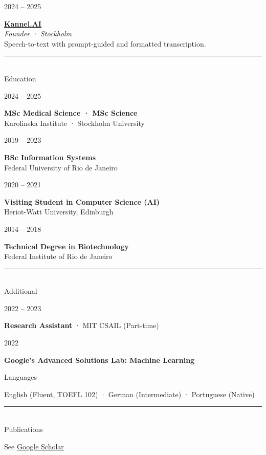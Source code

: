\documentclass[11pt,a4paper]{article}
\newcommand{\cvsection}[1]{%
    \vspace{0.5em}
    \noindent
    \begin{minipage}[t]{2.5cm}
        \rule{2cm}{0.4pt}\\[0.1em]
        {\large #1}
    \end{minipage}%
    \hfill
    \begin{minipage}[t]{14cm}
        \vspace{1.1em}
    \end{minipage}
    \vspace{0em}
}
\newcommand{\cventry}[4]{%
    \noindent
    \begin{minipage}[t]{2.5cm}
        \raggedleft
        \small #1
    \end{minipage}%
    \hfill
    \begin{minipage}[t]{14cm}
        \textbf{#2}\\
        \textit{#3}\\[0.1em]
        #4
    \end{minipage}
    \vspace{0.3em}
}
\newcommand{\cventrysimple}[3]{%
    \noindent
    \begin{minipage}[t]{2.5cm}
        \raggedleft
        \small #1
    \end{minipage}%
    \hfill
    \begin{minipage}[t]{13.5cm}
        \textbf{#2}\\
        #3
    \end{minipage}
    \vspace{0.4em}
}
\newcommand{\cvline}[2]{%
    \noindent
    \begin{minipage}[t]{2.5cm}
        \raggedleft
        \small #1
    \end{minipage}%
    \hfill
    \begin{minipage}[t]{14cm}
        #2
    \end{minipage}
    \vspace{0.1em}
}
\begin{document}
\cventry{2024 -- 2025}{\href{https://kannel.ai}{\underline{Kannel.AI}}}{Founder · Stockholm}{Speech-to-text with prompt-guided and formatted transcription.}

\cvsection{Education}

\cventrysimple{2024 -- 2025}{MSc Medical Science · MSc Science}{Karolinska Institute · Stockholm University}

\cventrysimple{2019 -- 2023}{BSc Information Systems}{Federal University of Rio de Janeiro}

\cventrysimple{2020 -- 2021}{Visiting Student in Computer Science (AI)}{Heriot-Watt University, Edinburgh}

\cventrysimple{2014 -- 2018}{Technical Degree in Biotechnology}{Federal Institute of Rio de Janeiro}

\cvsection{Additional}

\cvline{2022 -- 2023}{\textbf{Research Assistant} · MIT CSAIL (Part-time)}

\cvline{2022}{\textbf{Google's Advanced Solutions Lab: Machine Learning}}

\cvline{Languages}{English (Fluent, TOEFL 102) · German (Intermediate) · Portuguese (Native)}

\cvsection{Publications}

\cvline{}{See \href{https://scholar.google.com/citations?user=WaAoUqsAAAAJ}{\underline{Google Scholar}}}
\end{document}
